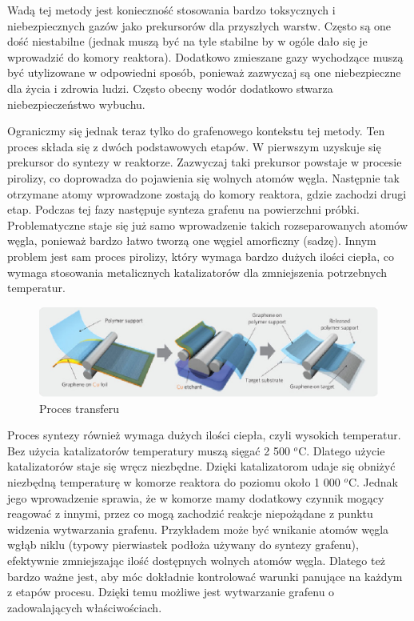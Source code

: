 	Wadą tej metody jest konieczność stosowania bardzo toksycznych i niebezpiecznych gazów jako prekursorów dla 
	przyszłych warstw. Często są one dość niestabilne (jednak muszą być na tyle stabilne by w ogóle dało się
	je wprowadzić do komory reaktora). Dodatkowo zmieszane gazy wychodzące muszą być utylizowane w odpowiedni
	sposób, ponieważ zazwyczaj są one niebezpieczne dla życia i zdrowia ludzi. Często obecny wodór dodatkowo 
	stwarza niebezpieczeństwo wybuchu.

	Ograniczmy się jednak teraz tylko do grafenowego kontekstu tej metody. Ten proces składa się z dwóch podstawowych
	etapów. W pierwszym uzyskuje się prekursor do syntezy w reaktorze. Zazwyczaj taki prekursor powstaje w procesie
	pirolizy, co doprowadza do pojawienia się wolnych atomów węgla. Następnie tak otrzymane atomy wprowadzone zostają
	do komory reaktora, gdzie zachodzi drugi etap. Podczas tej fazy następuje synteza grafenu na powierzchni próbki.
	Problematyczne staje się już samo wprowadzenie takich rozseparowanych atomów węgla, ponieważ bardzo łatwo tworzą
	one węgiel amorficzny (sadzę). Innym problem jest sam proces pirolizy, który wymaga bardzo dużych ilości ciepła,
	co wymaga stosowania metalicznych katalizatorów dla zmniejszenia potrzebnych temperatur.
	
	\begin{figure}[ht]
	\centering
	\includegraphics[width=1.0\textwidth]{./Rozdzial_2/obrazki/transfer.png}
	\caption{Proces transferu}
	\label{fig:transfer}
	\end{figure}

	Proces syntezy również wymaga dużych ilości ciepła, czyli wysokich temperatur. Bez użycia katalizatorów 
	temperatury muszą sięgać 2 500 $^o$C. Dlatego użycie katalizatorów staje się wręcz niezbędne.
	Dzięki katalizatorom udaje się obniżyć niezbędną temperaturę w komorze reaktora do poziomu około 1 000 $^o$C.
	Jednak jego wprowadzenie sprawia, że w komorze mamy dodatkowy czynnik mogący reagować z innymi, przez co mogą 
	zachodzić reakcje niepożądane z punktu widzenia wytwarzania grafenu. Przykładem może być wnikanie atomów węgla
	wgłąb niklu (typowy pierwiastek podłoża używany do syntezy grafenu), efektywnie zmniejszając ilość dostępnych 
	wolnych atomów węgla.
	Dlatego też bardzo ważne jest, aby móc dokładnie kontrolować warunki panujące na każdym z etapów procesu.
	Dzięki temu możliwe jest wytwarzanie grafenu o zadowalających właściwościach.
	
